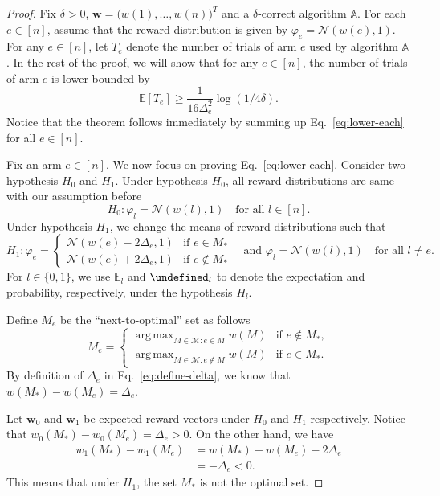 \documentclass{article}
\newcommand{\Rew}{\varphi}
\newcommand{\E}{\mathbb E}
\newcommand{\M}{\mathcal M}
\DeclareMathOperator*{\argmax}{arg\,max}
\let\Pr\undefined
\DeclareMathOperator{\Pr}{Pr}
\renewcommand{\vec}[1]{\boldsymbol{#1}}
\begin{document}
\begin{proof}
Fix $\delta >0$, $\vec w =\big(w(1),\ldots,w(n)\big)^T$ and a $\delta$-correct algorithm $\mathbb A$.
For each $e\in [n]$, assume that the reward distribution is given by $\Rew_e=\mathcal N(w(e),1)$.
For any $e\in [n]$, let $T_e$ denote the  number of trials of arm $e$ used by algorithm $\mathbb A$.
In the rest of the proof, we will show that for any $e\in [n]$, the number of trials of arm $e$ is lower-bounded by
\begin{equation}
\E[T_e] \ge \frac{1}{16\Delta_e^2}\log(1/4\delta).
\label{eq:lower-each}
\end{equation}
Notice that the theorem follows immediately by summing up Eq.~\eqref{eq:lower-each} for all $e\in[n]$.


Fix an arm $e\in [n]$. We now focus on proving Eq.~\eqref{eq:lower-each}.
Consider two hypothesis $H_0$ and $H_1$. 
Under hypothesis $H_0$, all reward distributions are same with our assumption before
$$
H_0: \Rew_l = \mathcal N(w(l),1) \quad \text{for all } l \in [n].
$$
Under hypothesis $H_1$, we change the means of reward distributions such that 
$$
H_1: 
	\Rew_e = \begin{cases}
	\mathcal N(w(e)-2\Delta_e,1) & \text{if } e\in M_*\\
	\mathcal N(w(e)+2\Delta_e,1) & \text{if } e\not\in M_*
\end{cases} 
\quad\text{and } \Rew_l=\mathcal N(w(l), 1) \quad\text{for all } l\not = e.
$$
For $l\in \{0,1\}$, we use $\E_l$ and $\Pr_l$ to denote the expectation and probability, respectively, under the hypothesis $H_l$.


Define $M_e$ be the ``next-to-optimal'' set as follows 
$$
M_e = \begin{cases}
		 \argmax_{M\in \M: e \in M} w(M) & \text{if } e\not \in M_*, \\
	     \argmax_{M\in \M: e \not\in M} w(M) & \text{if } e\in M_*.
	  \end{cases}
$$
By definition of $\Delta_e$ in Eq.~\eqref{eq:define-delta}, we know that $w(M_*)-w(M_e)=\Delta_e$.

Let $\vec w_0$ and $\vec w_1$ be expected reward vectors under $H_0$ and $H_1$ respectively.
Notice that $w_0(M_*)-w_0(M_e)=\Delta_e > 0$.
On the other hand, we have
\begin{align*}
w_1(M_*)-w_1(M_e) &= w(M_*)-w(M_e)-2\Delta_e \\
								  &= -\Delta_e < 0.
\end{align*}
This means that under $H_1$, the set $M_*$ is not the optimal set.


\end{proof}
\end{document}

